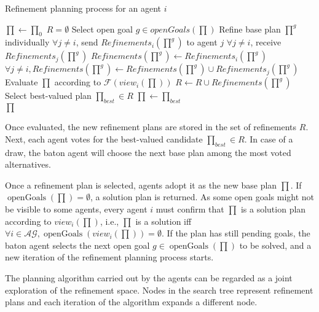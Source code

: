 \documentclass[12pt]{article}
\DeclareMathOperator{\openGoals}{openGoals}
\begin{document}
\begin{algorithm}
\caption{Refinement planning process for an agent $i$}
\label{alg:2}
  \begin{algorithmic}
    \State $\prod \leftarrow \prod_0$
    \State $R = \emptyset$
    \Repeat
      \State Select open goal $g \in openGoals(\prod)$
      \State Refine base plan $\prod^g$ individually
      \State $\forall j \neq i$, send $Refinements_i(\prod^g)$ to agent $j$
      \State $\forall j \neq i$, receive $Refinements_j(\prod^g)$
      \State $Refinements(\prod^g) \leftarrow Refinements_i(\prod^g)$
      \State $\forall j \neq i, Refinements(\prod^g) \leftarrow Refinements(\prod^g) \cup Refinements_j(\prod^g)$
        \State Evaluate $\prod$ according to $\mathcal{F}(view_i(\prod))$
      \EndFor
      \State $R \leftarrow R \cup Refinements(\prod^g)$
      \State Select best-valued plan $\prod_{best} \in R$
      \State $\prod \leftarrow \prod_{best}$
      \If{$\openGoals(\prod) = \emptyset$}\\
        \hspace{\algorithmicindent}\hspace{\algorithmicindent}\Return $\prod$
      \EndIf
  \end{algorithmic}
\end{algorithm}

Once evaluated, the new refinement plans are stored in the set of refinements $R$.
Next, each agent votes for the best-valued candidate $\prod_{best} \in R$.
In case of a draw, the baton agent will choose the next base plan among the most voted alternatives.

Once a refinement plan is selected, agents adopt it as the new base plan $\prod$.
If $\openGoals(\prod) = \emptyset$, a solution plan is returned.
As some open goals might not be visible to some agents, every agent $i$ must confirm that $\prod$ is a solution plan according to $view_i(\prod)$, i.e., $\prod$ is a solution iff $\forall i \in \mathcal{AG}, \openGoals(view_i(\prod)) = \emptyset$.
If the plan has still pending goals, the baton agent selects the next open goal $g \in \openGoals(\prod)$ to be solved, and a new iteration of the refinement planning process starts.

The planning algorithm carried out by the agents can be regarded as a joint exploration of the refinement space.
Nodes in the search tree represent refinement plans and each iteration of the algorithm expands a different node.
\end{document}
